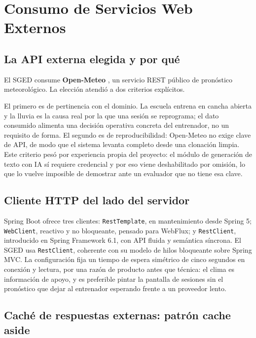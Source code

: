 \documentclass[12pt,a4paper]{article}
\begin{document}
\section{Consumo de Servicios Web Externos}
\label{sec:api-externa}

\subsection{La API externa elegida y por qué}

El SGED consume \textbf{Open-Meteo} \parencite{openmeteo2026}, un servicio REST público de
pronóstico meteorológico. La elección atendió a dos criterios explícitos.

El primero es de pertinencia con el dominio. La escuela entrena en cancha abierta y la lluvia es
la causa real por la que una sesión se reprograma; el dato consumido alimenta una decisión
operativa concreta del entrenador, no un requisito de forma. El segundo es de reproducibilidad:
Open-Meteo no exige clave de API, de modo que el sistema levanta completo desde una clonación
limpia. Este criterio pesó por experiencia propia del proyecto: el módulo de generación de texto
con IA sí requiere credencial y por eso viene deshabilitado por omisión, lo que lo vuelve
imposible de demostrar ante un evaluador que no tiene esa clave.

\subsection{Cliente HTTP del lado del servidor}

Spring Boot ofrece tres clientes: \texttt{RestTemplate}, en mantenimiento desde Spring 5;
\texttt{WebClient}, reactivo y no bloqueante, pensado para WebFlux; y \texttt{RestClient},
introducido en Spring Framework 6.1, con API fluida y semántica síncrona. El SGED usa
\texttt{RestClient}, coherente con su modelo de hilos bloqueante sobre Spring MVC. La
configuración fija un tiempo de espera simétrico de cinco segundos en conexión y lectura, por una
razón de producto antes que técnica: el clima es información de apoyo, y es preferible pintar la
pantalla de sesiones sin el pronóstico que dejar al entrenador esperando frente a un proveedor
lento.

\subsection{Caché de respuestas externas: patrón cache aside}
\end{document}
